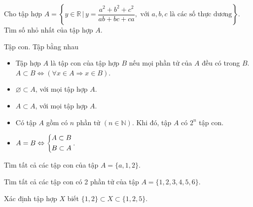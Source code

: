 \begin{bt}%
Cho tập hợp  $A = \left\{y \in \mathbb{R} \, \big| \,  y = \dfrac{a^2+b^2+c^2}{ab+bc+ca}, \text{ với } a,b,c \text{ là các số thực dương}\right\}$. Tìm số nhỏ nhất của tập hợp $A$.
\end{bt}
\setcounter{bt}{0}
\setcounter{vd}{0}
\begin{dang}{Tập con. Tập bằng nhau}
	
	\begin{itemize}
		\item  Tập hợp $A$ là tập con của tập hợp $B$ nếu mọi phần tử của $A$ đều có trong $B$.\\
		$ A \subset B \Leftrightarrow \left(\forall x \in A \Rightarrow x \in B\right)$.
		\item $\varnothing \subset A$, với mọi tập hợp $A$.
		\item $A \subset A$, với mọi tập hợp $A$.
		\item Có tập $A$ gồm có $n$ phần tử $ \left(n \in \mathbb{N}\right)$. Khi đó, tập $A$ có $2^n$ tập con.
		\item $A=B \Leftrightarrow \left\{\begin{aligned}&A \subset B\\ &B\subset A\end{aligned}\right.$.
	\end{itemize}
\end{dang}
\begin{vd}%
	Tìm tất cả các tập con của tập $A=\{a,1,2\}$.
\end{vd}
\begin{vd}%
	Tìm tất cả các tập con có 2 phần tử của tập $A=\{1,2,3,4,5,6\}$.
\end{vd}
\begin{vd}%
	Xác định tập hợp $X$ biết $\{1,2\} \subset X \subset \{1,2,5\}$.
\end{vd}
